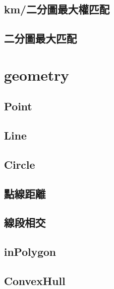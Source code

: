 \documentclass[a4paper,10pt,twocolumn,oneside]{article}
\begin{document}
    \subsection{km/二分圖最大權匹配}
    

    \subsection{二分圖最大匹配}
    


\section{geometry}
    \subsection{Point}
    

    \subsection{Line}
    

    \subsection{Circle}
    

    \subsection{點線距離}
    

    \subsection{線段相交}
    

    \subsection{inPolygon}
    
    
    \subsection{ConvexHull}
    
    
\end{document}
